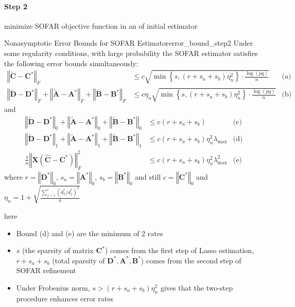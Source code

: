 \documentclass[twoside]{article}
\begin{document}
\paragraph*{Step 2}  minimize SOFAR objective function in an  of initial estimator
\begin{theorem}{Nonasymptotic Error Bounds for SOFAR Estimator}{error_bound_step2}
    Under some regularity conditions, with large probability the SOFAR estimator satisfies the following error bounds simultaneously:
    \begin{align*}
        \left\Vert \tilde{\mathbf{C}}-\mathbf{C}^* \right\Vert _F &\leq c\sqrt{\min\left\{s,(r+s_a+s_b)\eta^2_n\right\}\cdot \frac{ \log (pq)}{n}} & \text{(a)}\\
        \left\Vert \tilde{\mathbf{D}}-\mathbf{D}^* \right\Vert _F + \left\Vert \tilde{\mathbf{A}}-\mathbf{A}^* \right\Vert _F + \left\Vert \tilde{\mathbf{B}}-\mathbf{B}^* \right\Vert _F &\leq c\eta_n\sqrt{ \min\left\{s,(r+s_a+s_b)\eta^2_n\right\} \cdot \frac{\log (pq)}{n}} &\text{(b)}
    \end{align*}
    and 
    \begin{align*}
        \left\Vert \tilde{\mathbf{D}}-\mathbf{D}^* \right\Vert _0 + \left\Vert \tilde{\mathbf{A}}-\mathbf{A}^* \right\Vert _0 + \left\Vert \tilde{\mathbf{B}}-\mathbf{B}^* \right\Vert _0 &\leq c (r+s_a+s_b) & \text{(c)}\\
        \left\Vert \tilde{\mathbf{D}}-\mathbf{D}^* \right\Vert _1 + \left\Vert \tilde{\mathbf{A}}-\mathbf{A}^* \right\Vert _1 + \left\Vert \tilde{\mathbf{B}}-\mathbf{B}^* \right\Vert _1 &\leq c(r+s_a+s_b) \eta_n^2\lambda_{\max} & \text{(d)}\\
        \frac{1}{n} \left\Vert \mathbf{X}\left(\hat{\mathbf{C}}-\mathbf{C}^*\right) \right\Vert ^2_F & \leq c(r+s_a+s_b)\eta_n^2\lambda_{\max}^2 & \text{(e)}
    \end{align*}
    where $r=\left\Vert \mathbf{D}^* \right\Vert _0$, $s_a = \left\Vert \mathbf{A}^* \right\Vert _0$, $s_b=\left\Vert \mathbf{B}^* \right\Vert _0$ and still $c= \left\Vert \mathbf{C}^* \right\Vert _0$ and $\eta_n = 1+ \sqrt{\frac{\sum^r_{j=1}(d_1^*/d_j^*)^2}{\delta}} $
\end{theorem}
here 
\begin{itemize}
    \item Bound (d) and (e) are the minimum of 2 rates
    \item $s$ (the sparsity of matrix $\mathbf{C}^*$) comes from the first step of Lasso estimation, $r+s_a+s_b$ (total sparsity of $\mathbf{D}^*,\mathbf{A}^*,\mathbf{B}^*$) comes from the second step of SOFAR refinement
    \item Under Frobenius norm, $s>(r+s_a +s_b)\eta_n^2$ gives that the two-step procedure enhances error rates
\end{itemize}
\end{document}
